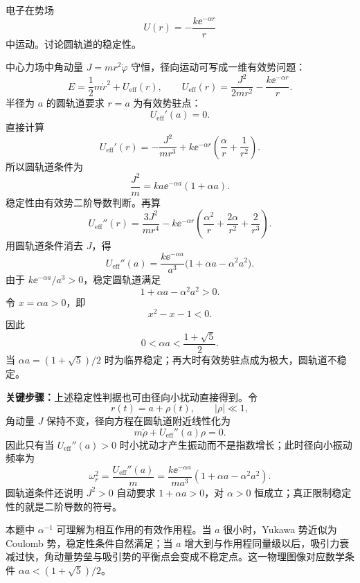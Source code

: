 \begin{question}[圆轨道稳定性]
电子在势场
\[
  U(r)=-\frac{k\ee^{-\alpha r}}{r}
\]
中运动。讨论圆轨道的稳定性。

\begin{solution}
中心力场中角动量 $J=mr^2\dot\varphi$ 守恒，径向运动可写成一维有效势问题：
\[
  E=\frac12m\dot r^2+U_{\mathrm{eff}}(r),
  \qquad
  U_{\mathrm{eff}}(r)=\frac{J^2}{2mr^2}-\frac{k\ee^{-\alpha r}}{r}.
\]
半径为 $a$ 的圆轨道要求 $r=a$ 为有效势驻点：
\[
  U_{\mathrm{eff}}'(a)=0.
\]
直接计算
\[
  U_{\mathrm{eff}}'(r)=-\frac{J^2}{mr^3}
  +k\ee^{-\alpha r}\left(\frac{\alpha}{r}+\frac1{r^2}\right).
\]
所以圆轨道条件为
\[
  \frac{J^2}{m}=ka\ee^{-\alpha a}(1+\alpha a).
\]
稳定性由有效势二阶导数判断。再算
\[
  U_{\mathrm{eff}}''(r)
  =\frac{3J^2}{mr^4}
  -k\ee^{-\alpha r}\left(\frac{\alpha^2}{r}+\frac{2\alpha}{r^2}+\frac2{r^3}\right).
\]
用圆轨道条件消去 $J$，得
\[
  U_{\mathrm{eff}}''(a)
  =\frac{k\ee^{-\alpha a}}{a^3}\bigl(1+\alpha a-\alpha^2a^2\bigr).
\]
由于 $k\ee^{-\alpha a}/a^3>0$，稳定圆轨道满足
\[
  1+\alpha a-\alpha^2a^2>0.
\]
令 $x=\alpha a>0$，即
\[
  x^2-x-1<0.
\]
因此
\[
  \boxed{0<\alpha a<\frac{1+\sqrt5}{2}.}
\]
当 $\alpha a=(1+\sqrt5)/2$ 时为临界稳定；再大时有效势驻点成为极大，圆轨道不稳定。


\medskip
\textbf{关键步骤：}上述稳定性判据也可由径向小扰动直接得到。令
\[
  r(t)=a+\rho(t),\qquad |\rho|\ll 1,
\]
角动量 $J$ 保持不变，径向方程在圆轨道附近线性化为
\[
  m\ddot\rho+U_{\mathrm{eff}}''(a)\rho=0.
\]
因此只有当 $U_{\mathrm{eff}}''(a)>0$ 时小扰动才产生振动而不是指数增长；此时径向小振动频率为
\[
  \omega_r^2=\frac{U_{\mathrm{eff}}''(a)}{m}
  =\frac{k\ee^{-\alpha a}}{ma^3}\left(1+\alpha a-\alpha^2a^2\right).
\]
圆轨道条件还说明 $J^2>0$ 自动要求 $1+\alpha a>0$，对 $\alpha>0$ 恒成立；真正限制稳定性的就是二阶导数的符号。


\medskip
本题中 $\alpha^{-1}$ 可理解为相互作用的有效作用程。当 $a$ 很小时，Yukawa 势近似为 Coulomb 势，稳定性条件自然满足；当 $a$ 增大到与作用程同量级以后，吸引力衰减过快，角动量势垒与吸引势的平衡点会变成不稳定点。这一物理图像对应数学条件 $\alpha a<(1+\sqrt5)/2$。
\end{solution}
\end{question}

